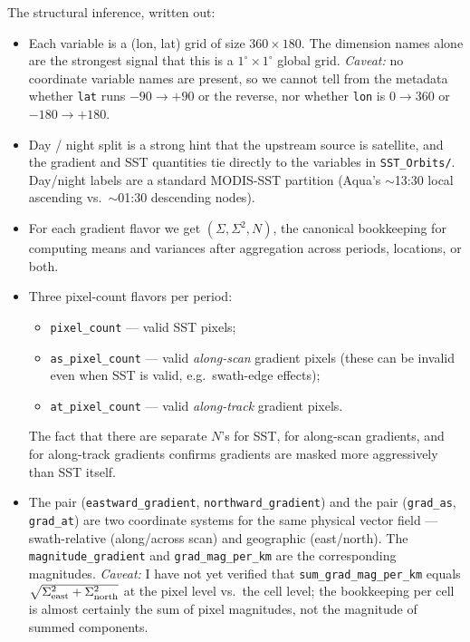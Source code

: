 \documentclass[11pt]{article}
\begin{document}
The structural inference, written out:
\begin{itemize}
  \item Each variable is a (lon, lat) grid of size $360\times180$.
    The dimension names alone are the strongest signal that this is
    a $1^\circ \times 1^\circ$ global grid. \emph{Caveat:} no
    coordinate variable names are present, so we cannot tell from
    the metadata whether \texttt{lat} runs $-90 \to +90$ or the
    reverse, nor whether \texttt{lon} is $0\to 360$ or $-180\to
    +180$.
  \item Day / night split is a strong hint that the upstream source
    is satellite, and the gradient and SST quantities tie directly
    to the variables in \texttt{SST\_Orbits/}. Day/night labels are
    a standard MODIS-SST partition (Aqua's $\sim$13:30 local
    ascending vs.\ $\sim$01:30 descending nodes).
  \item For each gradient flavor we get $(\Sigma, \Sigma^2, N)$, the
    canonical bookkeeping for computing means and variances after
    aggregation across periods, locations, or both.
  \item Three pixel-count flavors per period:
    \begin{itemize}
      \item \texttt{pixel\_count} --- valid SST pixels;
      \item \texttt{as\_pixel\_count} --- valid \emph{along-scan}
        gradient pixels (these can be invalid even when SST is valid,
        e.g.\ swath-edge effects);
      \item \texttt{at\_pixel\_count} --- valid \emph{along-track}
        gradient pixels.
    \end{itemize}
    The fact that there are separate $N$'s for SST, for along-scan
    gradients, and for along-track gradients confirms gradients are
    masked more aggressively than SST itself.
  \item The pair (\texttt{eastward\_gradient},
    \texttt{northward\_gradient}) and the pair
    (\texttt{grad\_as}, \texttt{grad\_at}) are two coordinate
    systems for the same physical vector field --- swath-relative
    (along/across scan) and geographic (east/north). The
    \texttt{magnitude\_gradient} and \texttt{grad\_mag\_per\_km} are
    the corresponding magnitudes. \emph{Caveat:} I have not yet
    verified that \texttt{sum\_grad\_mag\_per\_km} equals
    $\sqrt{\Sigma_{\rm east}^2 + \Sigma_{\rm north}^2}$ at the
    pixel level vs.\ the cell level; the bookkeeping per cell is
    almost certainly the sum of pixel magnitudes, not the magnitude
    of summed components.
\end{itemize}
\end{document}

